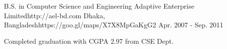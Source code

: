 

\begin{workentries}

  \workentry
    {B.S. in Computer Science and Engineering} %
    {Adaptive Enterprise Limited}{http://ael-bd.com} %
    {Dhaka, Bangladesh}{https://goo.gl/maps/X7X8MpGaKgG2} %
    {Apr. 2007 - Sep. 2011} %
    {
      \begin{workitems} %
        \item {Completed graduation with CGPA 2.97 from CSE Dept.}
      \end{workitems}
    }

\end{workentries}
